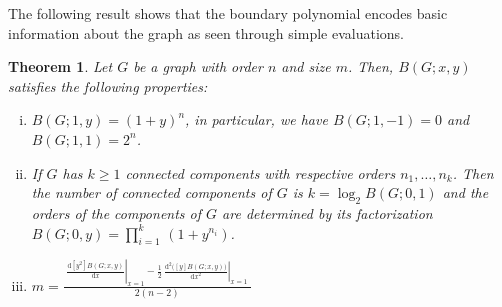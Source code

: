 \documentclass[review]{elsarticle}
\newtheorem{theorem}{Theorem}[section]
\begin{document}
The following result shows that the boundary polynomial encodes basic information about the graph as seen through simple evaluations.

\begin{theorem}\label{t:eval}
 Let $G$ be a graph with order $n$ and size $m$. Then, $B(G;x,y)$ satisfies the following properties:

   \begin{enumerate}[i)]
     \item $B(G;1,y)=(1+y)^n$, in particular, we have $B(G;1,-1)= 0$ and $B(G;1,1)=2^n$.

     \item If $G$ has $k\ge1$ connected components with respective orders $n_1,\ldots,n_k$. Then the number of connected components of $G$ is $k=\log_2 B(G;0,1)$ and the orders of the components of $G$ are determined by its factorization $B(G;0,y)=\displaystyle\prod_{i=1}^{k}\,(1+y^{n_i})$.

     \item $m=\displaystyle\frac{\;\displaystyle\left.\frac{\text{d}[y^2]B(G;x,y)}{\text{d}x}\right|_{x=1}-\frac12\,\left.\frac{\text{d}^2\big([y]B(G;x,y)\big)}{\text{d}x^2}\right|_{x=1}\;}{2(n-2)}$

   \end{enumerate}
\end{theorem}
\end{document}
